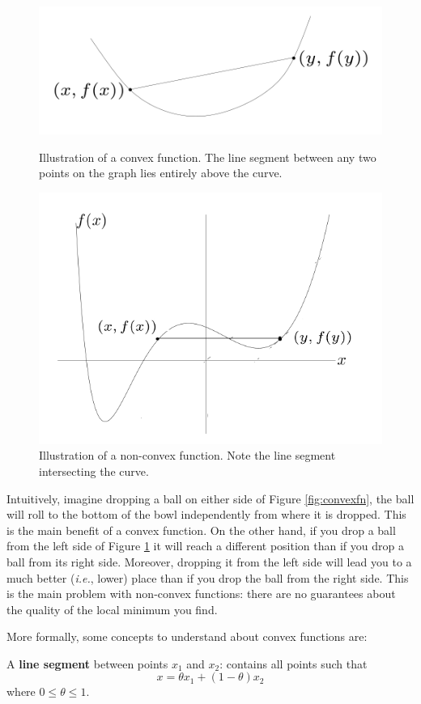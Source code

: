 \begin{figure}[h]
 \begin{center}
     \includegraphics[width=0.6\columnwidth]{figs/intro/convexfn.png}
   \caption{\label{fig:convexfn} Illustration of a convex function. The line segment between any two points on the graph lies entirely above the curve.} 
     \includegraphics[width=0.5\columnwidth]{figs/intro/nonconvexfn.png}
   \caption{\label{fig:nonconvexfn} Illustration of a non-convex function. Note the line segment intersecting the curve. } 
 \end{center}
 \end{figure}


Intuitively, imagine dropping a ball on either side of Figure \ref{fig:convexfn}, the ball will roll to the bottom of the bowl independently from where it is dropped. This is the main benefit of a convex function. On the other hand, if you drop a ball from the left side of Figure \ref{fig:nonconvexfn} it will reach a different position than if you drop a ball from its right side. Moreover, dropping it from the left side will lead you to a much better (\emph{i.e.}, lower) place than if you drop the ball from the right side. This is the main problem with non-convex functions: there are no guarantees about the quality of the local minimum you find.

More formally, some concepts to understand about convex functions are:

\noindent A {\bf line segment} between points $x_{1}$ and $x_{2}$: contains all points such that 
\begin{equation*}
x=\theta x_{1} + (1-\theta)x_{2}
\end{equation*}
where $0\leq \theta \leq 1$.


